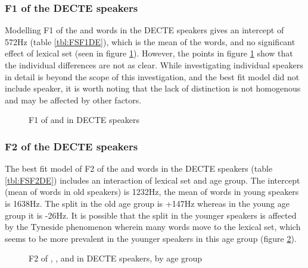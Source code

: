 \documentclass[../../../00.FullDoc/tex/APRReport-year4]{subfiles}
\begin{document}
\subsubsection{F1 of the DECTE speakers}
Modelling F1 of the \foot{} and \strutt{} words in the DECTE speakers gives an intercept of 572Hz (table \ref{tbl:FSF1DE}), which is the mean of the \foot{} words, and no significant effect of lexical set (seen in figure \ref{fig:FSF1DE}). However, the points in figure \ref{fig:FSF1DE} show that the individual differences are not as clear. While investigating individual speakers in detail is beyond the scope of this investigation, and the best fit model did not include speaker, it is worth noting that the lack of distinction is not homogenous and may be affected by other factors. 



\begin{figure}
	\centering
	
	\caption{F1 of \foot{} and \strutt{} in DECTE speakers} \label{fig:FSF1DE}
\end{figure}


\subsubsection{F2  of the DECTE speakers}
The best fit model of F2 of the \foot{} and \strutt{} words in the DECTE speakers (table \ref{tbl:FSF2DE}) includes an interaction of lexical set and age group. The intercept (mean of \foot{} words in old speakers) is 1232Hz, the mean of \foot{} words in young speakers is 1638Hz. The split in the old age group is +147Hz whereas in the young age group it is -26Hz. It is possible that the split in the younger speakers is affected by the Tyneside phenomenon wherein many \foot{} words move to the  lexical set, which seems to be more prevalent in the younger speakers in this age group (figure \ref{fig:FSGF2DE-age}). 




\begin{figure}
	\centering
	
	\caption{F2 of \foot{}, \strutt{}, and \goose{} in DECTE speakers, by age group} \label{fig:FSGF2DE-age}
\end{figure}
\end{document}
